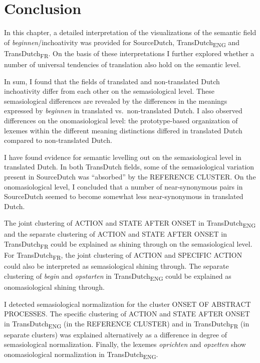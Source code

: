 \section{Conclusion}
\label{sec:4.8}  
In this chapter, a detailed interpretation of the visualizations of the semantic field of \textit{beginnen}/inchoativity was provided for SourceDutch, TransDutch\textsubscript{ENG} and TransDutch\textsubscript{FR}. On the basis of these interpretations I further explored whether a number of universal tendencies of translation also hold on the semantic level. 

In sum, I found that the fields of translated and non-translated Dutch inchoativity differ from each other on the semasiological level. These semasiological differences are revealed by the differences in the meanings expressed by \textit{beginnen} in translated vs.\ non-translated Dutch. I also observed differences on the onomasiological level: the prototype-based organization of lexemes within the different meaning distinctions differed in translated Dutch compared to non-translated Dutch.

I have found evidence for semantic levelling out on the semasiological level in translated Dutch. In both TransDutch fields, some of the semasiological variation present in SourceDutch was ``absorbed'' by the REFERENCE CLUSTER. On the onomasiological level, I concluded that a number of near-synonymous pairs in SourceDutch seemed to become somewhat less near-synonymous in translated Dutch.

The joint clustering of ACTION and STATE AFTER ONSET in TransDutch\textsubscript{ENG} and the separate clustering of ACTION and STATE AFTER ONSET in TransDutch\textsubscript{FR} could be explained as shining through on the semasiological level. For TransDutch\textsubscript{FR}, the joint clustering of ACTION and {SPECIFIC} ACTION could also be interpreted as semasiological shining through. The separate clustering of \textit{begin} and \textit{opstarten} in TransDutch\textsubscript{ENG} could be explained as onomasiological shining through.

I detected semasiological normalization for the cluster {ONSET OF ABSTRACT PROCESSES}. The specific clustering of ACTION and STATE AFTER ONSET in TransDutch\textsubscript{ENG} (in the REFERENCE CLUSTER) and in TransDutch\textsubscript{FR} (in separate clusters) was explained alternatively as a difference in degree of semasiological normalization. Finally, the lexemes \textit{oprichten} and \textit{opzetten} show onomasiological normalization in TransDutch\textsubscript{ENG}.

